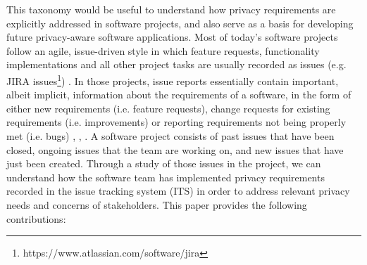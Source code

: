 This taxonomy would be useful to understand how privacy requirements are explicitly addressed in software projects, and also serve as a basis for developing future privacy-aware software applications. Most of today's software projects follow an agile, issue-driven style in which feature requests, functionality implementations and all other project tasks are usually recorded as issues (e.g. JIRA issues\footnote{https://www.atlassian.com/software/jira}) \cite{Choetkiertikul}. In those projects, issue reports essentially contain important, albeit implicit, information about the requirements of a software, in the form of either new requirements (i.e. feature requests), change requests for existing requirements (i.e. improvements) or reporting requirements not being properly met (i.e. bugs) \cite{Choetkiertikul}, \cite{MoodleTracker}, \cite{MoodleFeature}. A software project consists of past issues that have been closed, ongoing issues that the team are working on, and new issues that have just been created. Through a study of those issues in the project, we can understand how the software team has implemented privacy requirements recorded in the issue tracking system (ITS) in order to address relevant privacy needs and concerns of stakeholders. This paper provides the following contributions:

